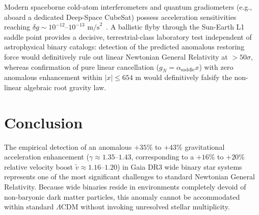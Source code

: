 \documentclass[aps,prd,reprint,superscriptaddress,nofootinbib,floatfix,amsmath,amssymb]{revtex4-2}
\begin{document}
Modern spaceborne cold-atom interferometers and quantum gradiometers (e.g., aboard a dedicated Deep-Space CubeSat) possess acceleration sensitivities reaching $\delta g \sim 10^{-12}\text{--}10^{-13}\text{ m/s}^2$~\cite{bothwell2022resolving}. A ballistic flyby through the Sun-Earth L1 saddle point provides a decisive, terrestrial-class laboratory test independent of astrophysical binary catalogs: detection of the predicted anomalous restoring force would definitively rule out linear Newtonian General Relativity at $>50\sigma$, whereas confirmation of pure linear cancellation ($g_N = \alpha_{\text{saddle}} x$) with zero anomalous enhancement within $|x| \le 654\text{ m}$ would definitively falsify the non-linear algebraic root gravity law.

\section{Conclusion}
\label{sec:conclusion}

The empirical detection of an anomalous $+35\%$ to $+43\%$ gravitational acceleration enhancement ($\gamma \approx 1.35\text{--}1.43$, corresponding to a $+16\%$ to $+20\%$ relative velocity boost $\tilde{v} \approx 1.16\text{--}1.20$) in Gaia DR3 wide binary star systems represents one of the most significant challenges to standard Newtonian General Relativity. Because wide binaries reside in environments completely devoid of non-baryonic dark matter particles, this anomaly cannot be accommodated within standard $\Lambda$CDM without invoking unresolved stellar multiplicity.
\end{document}

